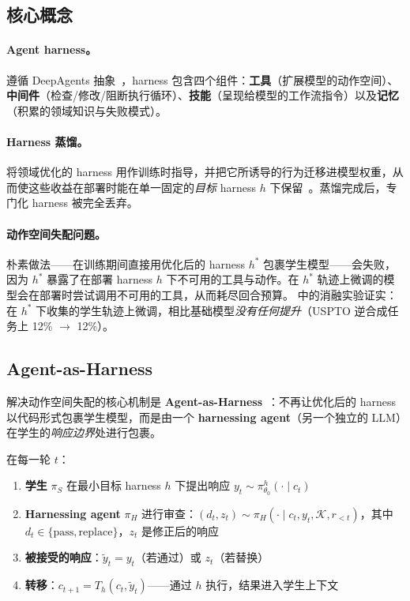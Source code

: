 \subsection{核心概念}
\label{subsec:harness-zero-concepts}

\paragraph{Agent harness。}遵循 DeepAgents 抽象~\cite{ye2026harnesszero}，harness 包含四个组件：\textbf{工具}（扩展模型的动作空间）、\textbf{中间件}（检查/修改/阻断执行循环）、\textbf{技能}（呈现给模型的工作流指令）以及\textbf{记忆}（积累的领域知识与失败模式）。

\paragraph{Harness 蒸馏。}将领域优化的 harness 用作训练时指导，并把它所诱导的行为迁移进模型权重，从而使这些收益在部署时能在单一固定的\emph{目标} harness $h$ 下保留~\cite{ye2026harnesszero}。蒸馏完成后，专门化 harness 被完全丢弃。

\paragraph{动作空间失配问题。}朴素做法——在训练期间直接用优化后的 harness $h^*$ 包裹学生模型——会失败，因为 $h^*$ 暴露了在部署 harness $h$ 下不可用的工具与动作。在 $h^*$ 轨迹上微调的模型会在部署时尝试调用不可用的工具，从而耗尽回合预算。\cite{ye2026harnesszero} 中的消融实验证实：在 $h^*$ 下收集的学生轨迹上微调，相比基础模型\emph{没有任何提升}（USPTO 逆合成任务上 12\% $\rightarrow$ 12\%）。

\subsection{Agent-as-Harness}
\label{subsec:agent-as-harness}

解决动作空间失配的核心机制是 \textbf{Agent-as-Harness}~\cite{ye2026harnesszero}：不再让优化后的 harness 以代码形式包裹学生模型，而是由一个 \textbf{harnessing agent}（另一个独立的 LLM）在学生的\emph{响应边界}处进行包裹。

在每一轮 $t$：
\begin{enumerate}
  \item \textbf{学生} $\pi_S$ 在最小目标 harness $h$ 下提出响应 $y_t \sim \pi^h_{\theta_0}(\cdot \mid c_t)$
  \item \textbf{Harnessing agent} $\pi_H$ 进行审查：$(d_t, z_t) \sim \pi_H(\cdot \mid c_t, y_t, \mathcal{K}, r_{<t})$，其中 $d_t \in \{\mathrm{pass}, \mathrm{replace}\}$，$z_t$ 是修正后的响应
  \item \textbf{被接受的响应}：$\tilde{y}_t = y_t$（若通过）或 $z_t$（若替换）
  \item \textbf{转移}：$c_{t+1} = T_h(c_t, \tilde{y}_t)$——通过 $h$ 执行，结果进入学生上下文
\end{enumerate}


